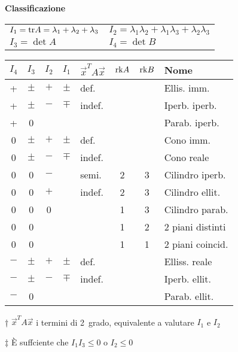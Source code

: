 \textbf{Classificazione}
\begin{tabular}{ll}
	$I_1=\mathrm{tr} A = \lambda_1+\lambda_2+\lambda_3$ & $I_2=\lambda_1\lambda_2+\lambda_1\lambda_3+\lambda_2\lambda_3$ \\
	$I_3 = \det A$ & $I_4 = \det B$
\end{tabular}

{
\begin{threeparttable}
\setlength{\tabcolsep}{0.5em}%
\begin{tabular}{c|c|c|c|l|c|c|l}
	\boldmath$I_4$
	         & \boldmath$I_3$
	                 & \boldmath$I_2$
	                       & \boldmath$I_1$
	                               & \boldmath$\vec{x}^TA\vec{x}$\tnote{†}
	                                          & \boldmath$\mathrm{rk} A$
	                                              & \boldmath$\mathrm{rk} B$
	                                                     & \textbf{Nome} \\
	\hline
	+        & $\pm$ & $+$ & $\pm$ & def.     &   &      & Ellis. imm. \\
	+        & $\pm$ & $-$\tnote{‡} & $\mp$ & indef.   &   &      & Iperb. iperb. \\
	+        & 0     &     &       &          &   &      & Parab. iperb. \\
	\hline
	0        & $\pm$ & $+$ & $\pm$ & def.     &   &      & Cono imm. \\
	0        & $\pm$ & $-$ & $\mp$ & indef.   &   &      & Cono reale \\
	0        & 0     & $-$ &       & semi.    & 2 & 3    & Cilindro iperb. \\
	0        & 0     & $+$ &       & indef.   & 2 & 3    & Cilindro ellit. \\
	0        & 0     & 0   &       &          & 1 & 3    & Cilindro parab. \\
	0        & 0     &     &       &          & 1 & 2    & 2 piani distinti \\
	0        & 0     &     &       &          & 1 & 1    & 2 piani coincid. \\
	\hline
	$-$      & $\pm$ & $+$ & $\pm$ & def.     &   &      & Elliss. reale \\
	$-$      & $\pm$ & $-$\tnote{‡} & $\mp$ & indef.   &   &      & Iperb. ellit. \\
	$-$      & 0     &     &       &          &   &      & Parab. ellit. \\
\end{tabular}
\begin{tablenotes}
	\item[†] $\vec{x}^TA\vec{x}$ i termini di 2\textdegree\ grado, equivalente a valutare $I_1$ e $I_2$
	\item[‡] È suffciente che $I_1I_3 \le 0$ o $I_2 \le 0$
\end{tablenotes}
\end{threeparttable}
}
